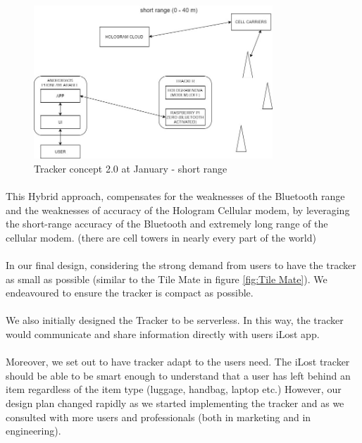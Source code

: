 \documentclass[12pt,a4paper]{article}
\begin{document}
        \begin{figure}[H]
          \centering
          \includegraphics[width=0.8\textwidth]{../assets/design-concept-v20-short-range.jpg}
          \caption{Tracker concept 2.0 at January - short range}
          \label{fig:Tracker concept at January - short range}
        \end{figure}
        
        \paragraph{} This Hybrid approach, compensates for the weaknesses of the Bluetooth range and the weaknesses of accuracy of the Hologram Cellular modem, by leveraging the short-range accuracy of the Bluetooth and extremely long range of the cellular modem. (there are cell towers in nearly every part of the world)
        
        \paragraph{} In our final design, considering the strong demand from users to have the tracker as small as possible (similar to the Tile Mate in figure \ref{fig:Tile Mate}). We endeavoured to ensure the tracker is compact as possible.
        
        \paragraph{} We also initially designed the Tracker to be serverless. In this way, the tracker would communicate and share information directly with users iLost app.
        
        \paragraph{} Moreover, we set out to have tracker adapt to the users need. The iLost tracker should be able to be smart enough to understand that a user has left behind an item regardless of the item type (luggage, handbag, laptop etc.) However, our design plan changed rapidly as we started implementing the tracker and as we consulted with more users and professionals (both in marketing and in engineering).
        
\end{document}
